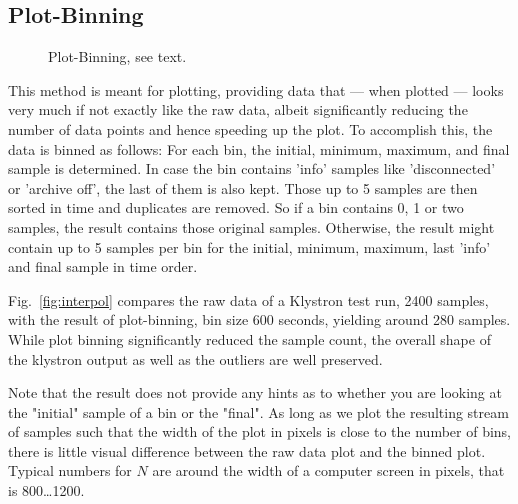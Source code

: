 \subsection{Plot-Binning} \label{sec:plotbinning}
\begin{figure}[htb]
\begin{center}
\medskip
{}
\end{center}
\caption{\label{fig:plotbin}Plot-Binning, see text.}
\end{figure}

This method is meant for plotting, providing data that --- when
plotted --- looks very much if not exactly like the raw data, albeit
significantly reducing the number of data points and hence speeding up
the plot.  To accomplish this, the data is binned as follows:
For each bin, the initial,  minimum, maximum, and final sample is
determined. In case the bin contains 'info' samples like 'disconnected'
or 'archive off', the last of them is also kept.
Those up to 5 samples are then sorted in time and duplicates are removed.
So if a bin contains 0, 1 or two samples, the result contains those original
samples. Otherwise, the result might contain up to 5 samples per bin for the
initial, minimum, maximum, last 'info' and final sample in time order.

\noindent Fig.~\ref{fig:interpol} compares the raw data of a Klystron
test run, 2400 samples, with the result of plot-binning, bin size 600
seconds, yielding around 280 samples. While plot binning significantly
reduced the sample count, the overall shape of the klystron output as
well as the outliers are well preserved.

Note that the result does not provide any hints as to whether you are looking
at the "initial" sample of a bin or the "final".
As long as we plot the resulting stream of samples such that the width of
the plot in pixels is close to the number of bins, there is little visual
difference between the raw data plot and the binned plot.  Typical
numbers for $N$ are around the width of a computer screen in pixels,
that is 800\ldots 1200.  
